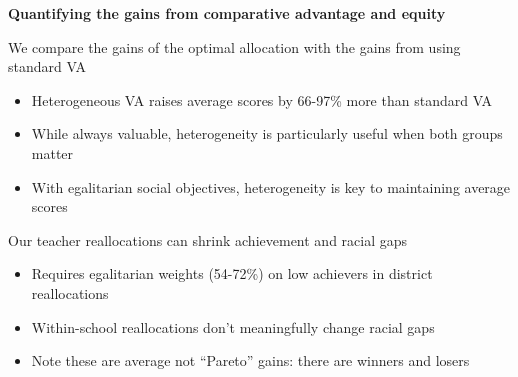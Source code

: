 \documentclass[t,aspectratio=169,11pt,presentation]{beamer}
\newenvironment{wideitemize}{\itemize\addtolength{\itemsep}{14pt}}{\enditemize}
\begin{document}
\begin{frame}{\textbf{Quantifying the gains from comparative advantage and equity}}
\begin{wideitemize}
    \item We compare the gains of the optimal allocation with the gains from using standard VA

    \hyperlink{versus}{} \hyperlink{dist_gains}{} \hyperlink{scores}{}
    \begin{itemize}
        \item<3-> Heterogeneous VA raises average scores by 66-97\% more than standard VA \hypertarget<5>{equity1}{} 
        \item<3-> While always valuable, heterogeneity is particularly useful when both groups matter
        \item<4-> With egalitarian social objectives, heterogeneity is key to maintaining average scores  \hypertarget<5>{equity2}{}
    \end{itemize}
    
    \item<5-> Our teacher reallocations can shrink achievement and racial gaps 

    \hyperlink{achgap}{} 
    \hyperlink{urmgap}{}
    \hyperlink{loser}{}
    
    \begin{itemize}
        \item<6-> Requires egalitarian weights (54-72\%) on low achievers in district reallocations
        \item<7-> Within-school reallocations don't meaningfully change racial gaps \hypertarget<7>{equity3}{}
        \item<8-> Note these are average not ``Pareto'' gains: there are winners and losers\hypertarget<8>{equity4}{}
    \end{itemize}

\end{wideitemize}
\end{frame}
\end{document}
